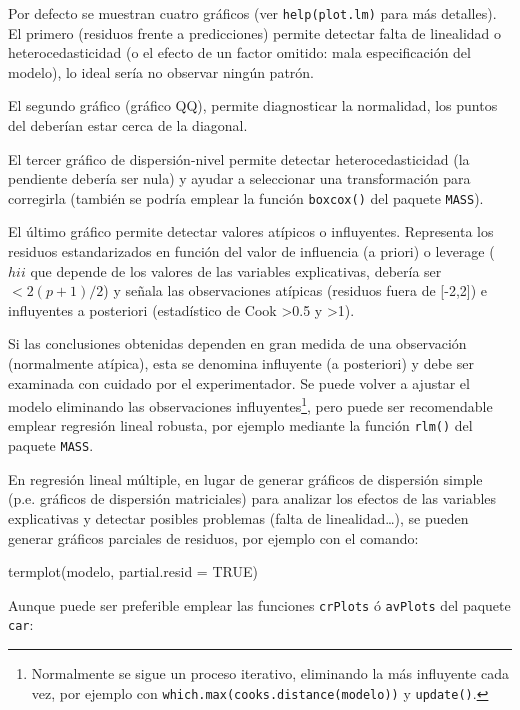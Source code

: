 \documentclass[
  spanish,
]{book}
\newenvironment{Shaded}{\begin{snugshade}}{\end{snugshade}}
\newcommand{\AttributeTok}[1]{\textcolor[rgb]{0.77,0.63,0.00}{#1}}
\newcommand{\ConstantTok}[1]{\textcolor[rgb]{0.00,0.00,0.00}{#1}}
\newcommand{\FunctionTok}[1]{\textcolor[rgb]{0.00,0.00,0.00}{#1}}
\newcommand{\NormalTok}[1]{#1}
\theoremstyle{break}
\theoremstyle{definition}
\theoremstyle{definition}
\theoremstyle{definition}
\theoremstyle{definition}
\theoremstyle{remark}
\begin{document}
Por defecto se muestran cuatro gráficos (ver \texttt{help(plot.lm)} para más detalles).
El primero (residuos frente a predicciones) permite detectar falta de
linealidad o heterocedasticidad (o el efecto de un factor omitido: mala
especificación del modelo), lo ideal sería no observar ningún patrón.

El segundo gráfico (gráfico QQ), permite diagnosticar la normalidad,
los puntos del deberían estar cerca de la diagonal.

El tercer gráfico de dispersión-nivel permite detectar heterocedasticidad (la pendiente debería ser nula) y ayudar a seleccionar una transformación para corregirla (también se podría emplear la función \texttt{boxcox()} del paquete \texttt{MASS}).

El último gráfico permite detectar valores atípicos o influyentes. Representa los residuos estandarizados en función del valor de influencia (a priori) o leverage (\(hii\) que depende de los valores de las variables explicativas, debería ser \(< 2(p+1)/2\)) y señala las observaciones atípicas (residuos fuera de {[}-2,2{]}) e influyentes a posteriori (estadístico de Cook \textgreater0.5 y \textgreater1).

Si las conclusiones obtenidas dependen en gran medida de una
observación (normalmente atípica), esta se denomina influyente (a
posteriori) y debe ser examinada con cuidado por el experimentador.
Se puede volver a ajustar el modelo eliminando las observaciones influyentes\footnote{Normalmente se sigue un proceso iterativo, eliminando la más influyente cada vez, por ejemplo con \texttt{which.max(cooks.distance(modelo))} y \texttt{update()}.},
pero puede ser recomendable emplear regresión lineal robusta,
por ejemplo mediante la función \texttt{rlm()} del paquete \texttt{MASS}.

En regresión lineal múltiple, en lugar de generar gráficos de dispersión simple
(p.e. gráficos de dispersión matriciales) para analizar los efectos de las variables explicativas y
detectar posibles problemas (falta de linealidad\ldots),
se pueden generar gráficos parciales de residuos, por ejemplo con el comando:

\begin{Shaded}
\begin{Highlighting}[]
\FunctionTok{termplot}\NormalTok{(modelo, }\AttributeTok{partial.resid =} \ConstantTok{TRUE}\NormalTok{)}
\end{Highlighting}
\end{Shaded}

Aunque puede ser preferible emplear las funciones \texttt{crPlots} ó \texttt{avPlots} del paquete \texttt{car}:
\end{document}
